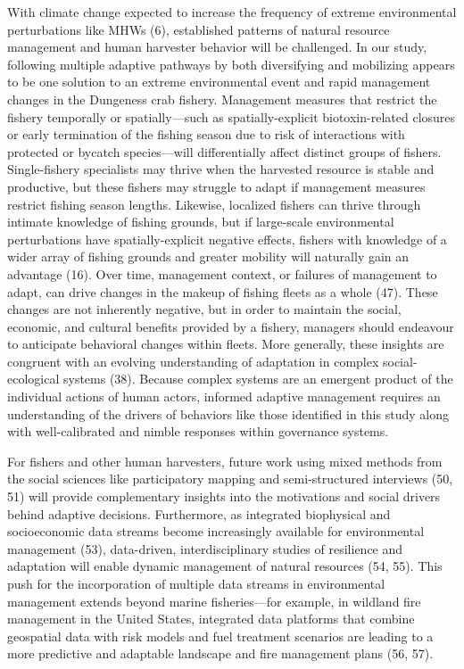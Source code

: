 \documentclass[9pt,twocolumn,twoside,lineno]{pnas-new}
\begin{document}
With climate change expected to increase the frequency of extreme
environmental perturbations like MHWs (6), established patterns of
natural resource management and human harvester behavior will be
challenged. In our study, following multiple adaptive pathways by both
diversifying and mobilizing appears to be one solution to an extreme
environmental event and rapid management changes in the Dungeness crab
fishery. Management measures that restrict the fishery temporally or
spatially---such as spatially-explicit biotoxin-related closures or
early termination of the fishing season due to risk of interactions with
protected or bycatch species---will differentially affect distinct
groups of fishers. Single-fishery specialists may thrive when the
harvested resource is stable and productive, but these fishers may
struggle to adapt if management measures restrict fishing season
lengths. Likewise, localized fishers can thrive through intimate
knowledge of fishing grounds, but if large-scale environmental
perturbations have spatially-explicit negative effects, fishers with
knowledge of a wider array of fishing grounds and greater mobility will
naturally gain an advantage (16). Over time, management context, or
failures of management to adapt, can drive changes in the makeup of
fishing fleets as a whole (47). These changes are not inherently
negative, but in order to maintain the social, economic, and cultural
benefits provided by a fishery, managers should endeavour to anticipate
behavioral changes within fleets. More generally, these insights are
congruent with an evolving understanding of adaptation in complex
social-ecological systems (38). Because complex systems are an emergent
product of the individual actions of human actors, informed adaptive
management requires an understanding of the drivers of behaviors like
those identified in this study along with well-calibrated and nimble
responses within governance systems.

For fishers and other human harvesters, future work using mixed methods
from the social sciences like participatory mapping and semi-structured
interviews (50, 51) will provide complementary insights into the
motivations and social drivers behind adaptive decisions. Furthermore,
as integrated biophysical and socioeconomic data streams become
increasingly available for environmental management (53), data-driven,
interdisciplinary studies of resilience and adaptation will enable
dynamic management of natural resources (54, 55). This push for the
incorporation of multiple data streams in environmental management
extends beyond marine fisheries---for example, in wildland fire
management in the United States, integrated data platforms that combine
geospatial data with risk models and fuel treatment scenarios are
leading to a more predictive and adaptable landscape and fire management
plans (56, 57).
\end{document}
